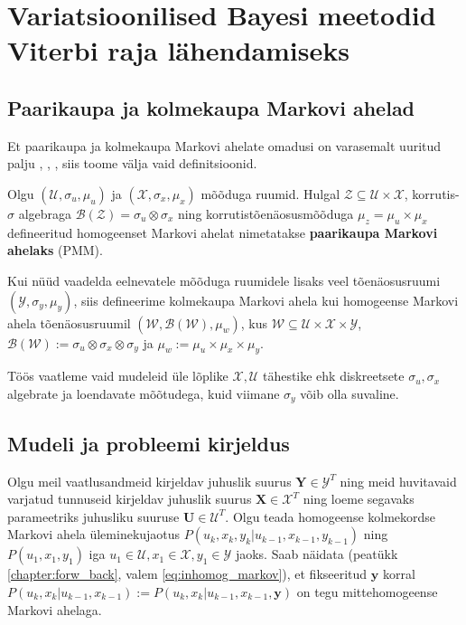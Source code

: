\section{Variatsioonilised Bayesi meetodid Viterbi raja lähendamiseks}

\subsection{Paarikaupa ja kolmekaupa Markovi ahelad}

Et paarikaupa ja kolmekaupa Markovi ahelate omadusi on varasemalt uuritud palju \parencite{Soop.2023}, \parencite{Avans.2021}, \bla, siis toome välja vaid definitsioonid.

Olgu $(\mathcal{U},\sigma_u,\mu_u)$ ja $(\mathcal{X},\sigma_x,\mu_x)$ mõõduga ruumid. Hulgal $\mathcal{Z} \subseteq \mathcal{U} \times \mathcal{X}$, korrutis-$\sigma$ algebraga $\mathcal{B}(\mathcal{Z}) = \sigma_u \otimes \sigma_x$ ning korrutistõenäosusmõõduga $\mu_z = \mu_u \times \mu_x$ defineeritud homogeenset Markovi ahelat nimetatakse \textbf{paarikaupa Markovi ahelaks} (PMM).

Kui nüüd vaadelda eelnevatele mõõduga ruumidele lisaks veel tõenäosusruumi $(\mathcal{Y},\sigma_y,\mu_y)$, siis defineerime kolmekaupa Markovi ahela kui homogeense Markovi ahela tõenäosusruumil $(\mathcal{W}, \mathcal{B}(\mathcal{W}),\mu_w)$, kus $\mathcal{W} \subseteq \mathcal{U} \times \mathcal{X} \times \mathcal{Y}$, $\mathcal{B}(\mathcal{W}) := \sigma_u \otimes \sigma_x \otimes \sigma_y$ ja $\mu_w := \mu_u \times \mu_x \times \mu_y$.

Töös vaatleme vaid mudeleid üle lõplike $\mathcal{X},\mathcal{U}$ tähestike ehk diskreetsete $\sigma_u, \sigma_x$ algebrate ja loendavate mõõtudega, kuid viimane $\sigma_y$ võib olla suvaline.


\subsection{Mudeli ja probleemi kirjeldus}

Olgu meil vaatlusandmeid kirjeldav juhuslik suurus $\bm{Y} \in \mathcal{Y}^T$ ning meid huvitavaid varjatud tunnuseid kirjeldav juhuslik suurus $\bm{X} \in \mathcal{X}^T$ ning loeme segavaks parameetriks juhusliku suuruse $\bm{U} \in \mathcal{U}^T$. Olgu teada homogeense kolmekordse Markovi ahela üleminekujaotus $P(u_k, x_k, y_k | u_{k-1}, x_{k-1}, y_{k-1})$ ning $P(u_1, x_1, y_1)$ iga $u_1 \in \mathcal{U}, x_1 \in \mathcal{X}, y_1 \in \mathcal{Y}$ jaoks. Saab näidata (peatükk \ref{chapter:forw_back}, valem \ref{eq:inhomog_markov}), et fikseeritud $\bm{y}$ korral $P(u_k, x_k | u_{k-1}, x_{k-1}) := P(u_k, x_k | u_{k-1}, x_{k-1}, \bm{y})$ on tegu mittehomogeense Markovi ahelaga.
    
